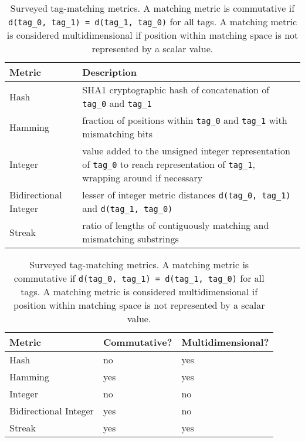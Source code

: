 \begin{table}[]
\begin{tabularx}{\textwidth}{l|X}
\textbf{Metric}       & \textbf{Description}                                                                                                                                        \\ \hline
Hash                  & SHA1 cryptographic hash of  concatenation of \texttt{tag\_0} and \texttt{tag\_1} \citep{eastlake2001us}                         \\ \hline
Hamming               & fraction of positions within \texttt{tag\_0} and \texttt{tag\_1} with mismatching bits                                                                         \\ \hline
Integer               & value added to the unsigned integer representation of \texttt{tag\_0} to reach representation of \texttt{tag\_1}, wrapping around if necessary \\ \hline
Bidirectional Integer & lesser of integer metric distances \texttt{d(tag\_0, tag\_1)} and \texttt{d(tag\_1, tag\_0)}                                                                \\ \hline
Streak                & ratio of lengths of contiguously matching and mismatching substrings \\ \hline
\end{tabularx}

\begin{tabularx}{\textwidth}{l|X|X}
\hline
\textbf{Metric}       & \textbf{Commutative?} & \textbf{Multidimensional?} \\ \hline
Hash                  & no                    & yes                        \\ \hline
Hamming               & yes                   & yes                        \\ \hline
Integer               & no                    & no                         \\ \hline
Bidirectional Integer & yes                   & no                         \\ \hline
Streak                & yes                   & yes
\end{tabularx}

\caption{
Surveyed tag-matching metrics. A matching metric is commutative if \texttt{d(tag\_0, tag\_1) = d(tag\_1, tag\_0)} for all tags.
A matching metric is considered multidimensional if position within matching space is not represented by a scalar value.
}
\label{tab:metrics}

\end{table}
